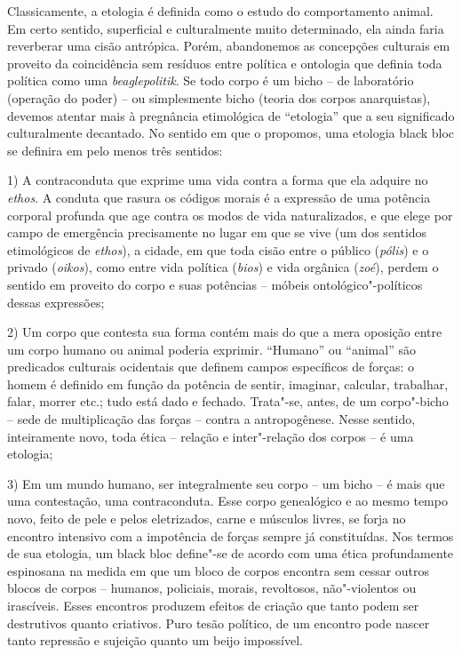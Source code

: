 Classicamente, a etologia é definida como o estudo do comportamento
animal. Em certo sentido, superficial e culturalmente muito determinado,
ela ainda faria reverberar uma cisão antrópica. Porém, abandonemos as
concepções culturais em proveito da coincidência sem resíduos entre
política e ontologia que definia toda política como uma
\emph{beaglepolitik}. Se todo corpo é um bicho -- de laboratório
(operação do poder) -- ou simplesmente bicho (teoria dos corpos
anarquistas), devemos atentar mais à pregnância etimológica de
``etologia'' que a seu significado culturalmente decantado. No sentido
em que o propomos, uma etologia black bloc se definira em pelo menos
três sentidos:

1) A contraconduta que exprime uma vida contra a forma que ela adquire
no \emph{ethos}. A conduta que rasura os códigos morais é a expressão de
uma potência corporal profunda que age contra os modos de vida
naturalizados, e que elege por campo de emergência precisamente no lugar
em que se vive (um dos sentidos etimológicos de \emph{ethos}), a cidade,
em que toda cisão entre o público (\emph{pólis}) e o privado
(\emph{oikos}), como entre vida política (\emph{bios}) e vida orgânica
(\emph{zoé}), perdem o sentido em proveito do corpo e suas potências --
móbeis ontológico"-políticos dessas expressões;

2) Um corpo que contesta sua forma contém mais do que a mera oposição
entre um corpo humano ou animal poderia exprimir. ``Humano'' ou
``animal'' são predicados culturais ocidentais que definem campos
específicos de forças: o homem é definido em função da potência de
sentir, imaginar, calcular, trabalhar, falar, morrer etc.; tudo está
dado e fechado. Trata"-se, antes, de um corpo"-bicho -- sede de
multiplicação das forças -- contra a antropogênese. Nesse sentido,
inteiramente novo, toda ética -- relação e inter"-relação dos corpos -- é
uma etologia;

3) Em um mundo humano, ser integralmente seu corpo -- um bicho -- é mais
que uma contestação, uma contraconduta. Esse corpo genealógico e ao
mesmo tempo novo, feito de pele e pelos eletrizados, carne e músculos
livres, se forja no encontro intensivo com a impotência de forças sempre
já constituídas. Nos termos de sua etologia, um black bloc define"-se de
acordo com uma ética profundamente espinosana na medida em que um bloco
de corpos encontra sem cessar outros blocos de corpos -- humanos,
policiais, morais, revoltosos, não"-violentos ou irascíveis. Esses
encontros produzem efeitos de criação que tanto podem ser destrutivos
quanto criativos. Puro tesão político, de um encontro pode nascer tanto
repressão e sujeição quanto um beijo impossível.

